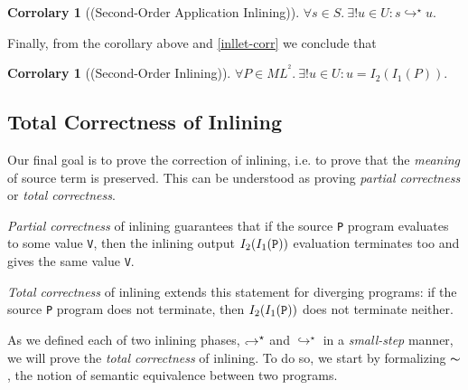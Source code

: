 \documentclass[a4paper,11pt,oneside]{article}
\theoremstyle{plain}
\newtheorem{corr}[definition]{Corrolary}
\newcommand{\inlsrc}{\textit{ML}^{^2}}
\newcommand{\hookdownarrow}{\mathrel{\rotatebox[origin=c]{180}{$\hookleftarrow$}}}
\newcommand{\ilarr}{\hookdownarrow}
\newcommand{\ilarrt}{\ilarr^{\star}}
\newcommand{\icarr}{\hookrightarrow}
\newcommand{\icarrt}{\icarr^{\star}}
\newcommand{\ict}[2]{#1 \icarrt #2}
\begin{document}
\begin{corr}[(Second-Order Application Inlining)] 
 $\forall s \in S.~ \exists !u \in U: \ict{s}{u}.$\end{corr} 
 Finally, from the corollary above and \cref{inllet-corr} we conclude that 
 \begin{corr}[(Second-Order Inlining)] 
 $\forall P \in \inlsrc.~ \exists !u \in U: u = I_2(I_1(P)) .$
\end{corr} 
	


\subsection{Total Correctness of Inlining}

	Our final goal is to prove the correction of inlining, i.e. to prove that the \textit{meaning} of source term is preserved. 
	This can be understood as proving \textit{partial correctness} or \textit{total correctness}.
	
	\textit{Partial correctness} of inlining guarantees that if the source \texttt{P} program evaluates to some value \texttt{V}, then the inlining output $I_2(I_1(\text{\texttt{P}}))$ evaluation terminates too and gives the same value \texttt{V}. 
	
	 \textit{Total correctness} of inlining extends this statement for diverging programs: if the source \texttt{P} program does not terminate, then $I_2(I_1(\text{\texttt{P}}))$ does not terminate neither.
	
	As we defined each of two inlining phases, $\ilarrt$ and $\icarrt$ in a \textit{small-step} manner, we will prove the \textit{total correctness} of inlining.	
	To do so, we start by formalizing $\thicksim$, the notion of semantic equivalence between two programs.
%	
		 
	
	
\end{document}
